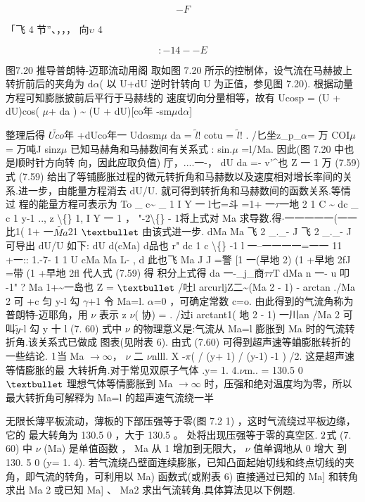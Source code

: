 \[-F\]

「飞 4 节''、，，， 向$\upsilon$ 4

\[: -14--E\]

图7.20 推导普朗特-迈耶流动用阁 取如图 7.20 所示的控制体，设气流在马赫披上转折前后的夹角为 d$\alpha$( 以 U+dU 逆时针转向 U 为正值，参见图 7.20). 根据动量方程可知膨胀披前后平行于马赫线的 速度切向分量相等，故有 Ucosp = (U + dU)cos( $\mu$+ da ) \textasciitilde{} (U + dU)[co年 -sm$\mu$d$\alpha$]

整理后得 $\tilde{Uco}$年 +dUco年一 Ud$\alpha$sm$\mu$ da = $\tilde{l}$! cotu = $\tilde{l}$! . /匕坐z\_p\_$\alpha$= 万 COI$\mu$= 万吨J sinz$\mu$ 已知马赫角和马赫数间有关系式 : sin.$\mu$ =l/Ma. 因此(图 7.20 中也是顺时针方向转 向，因此应取负值) 厅，....一-， dU da =- v'\textasciicircum{}也 Z 一 1 万 (7.59) 式 (7.59) 给出了等铺膨胀过程的微元转折角和马赫数以及速度相对增长率间的关 系.进一步，由能量方程消去 dU/U. 就可得到转折角和马赫数间的函数关系.等情过 程的能量方程可表示为 To \_ c\textasciitilde{} \_ 1 I Y 一 l七=斗 =1+ 一$\tau$一地 2 1 C \textasciitilde{} dc \_ c 1 y-1 .., z \textbackslash\{\} 1, I Y 一 1 ， "-2\textbackslash\{\} - 1将上式对 Ma 求导数.得$\cdot $一一一一一(一一比1( 1+ 一$\tilde{Ma}$21 ${\rm •}$ 由该式进一步. dMa Ma 飞 2 \_.\_- J 飞 2 \_.\_- J 可导出 dU/U 如下: dU d(cMa) d品也 r" dc 1 c \textbackslash\{\} -1 l 一--一一一一=一一 11 +一:: 1.-7- 1 1 U cMa Ma L- , d 此也飞 Ma J J =警 [1 一(早地 2) (1 +早地 2fJ =带 (1 +早地 2fl 代人式 (7.59) 得 积分上式得 da 一-\_j\_商$\tau$$\tau$T dMa n 一- u 叩 -1" ? Ma 1+\textasciitilde{}一岛也 Z = ${\rm •}$ /吐l arcurljZ二\textasciitilde{}(Ma 2 - 1) - arctan ./Ma 2 可 +c 匀 y-l 勾 $\gamma$+1 令 Ma=l. $\alpha$=0 ，可确定常数 c=o. 由此得到的气流角称为普朗特-迈耶角，用 $\nu$ 表示 z $\nu$( 协) = . /过i arctant1( 地 2 - 1) 一川an /Ma 2 可 叫$\tilde{y}$-l 勾 y 十 l (7. 60) 式中 $\nu$ 的物理意义是:气流从 Ma=l 膨胀到 Ma 时的气流转折角.该关系式已做成 图表(见附表 6). 由式 (7.60) 可得到超声速等蛐膨胀转折的一些结论. ${\rm 1}$当 Ma $\rightarrow$$\infty$， $\nu$ 二 $\nu$nlll. X -$\pi$( / (y+ 1) / (y-1) -1 ) /2. 这是超声速等情膨胀的最 大转折角.对于常见双原子气体 .y= 1. 4.$\nu$m.. = 130.5 0 ${\rm •}$ 理想气体等情膨胀到 Ma $\rightarrow$$\infty$ 时，压强和绝对温度均为零，所以最大转折角可解释为 Ma=l 的超声速气流绕一半

无限长薄平板流动，薄板的下部压强等于零(图 7.2 1) ，这时气流绕过平板边缘，它的 最大转角为 130.5 0 ，大于 130.5 。 处将出现压强等于零的真空区. ${\rm 2}$式 (7. 60) 中 $\nu$ (Ma) 是单值函数 ， Ma 从 1 增加到无限大， $\nu$ 值单调地从 0 增大 到 130. 5 0 (y= 1. 4). 若气流绕凸壁面连续膨胀，已知凸面起始切线和终点切线的夹 角，即气流的转角，可利用以 Ma) 函数式(或附表 6) 直接通过已知的 Ma] 和转角求出 Ma 2 或已知 Ma] 、 Ma2 求出气流转角.具体算法见以下例题.

